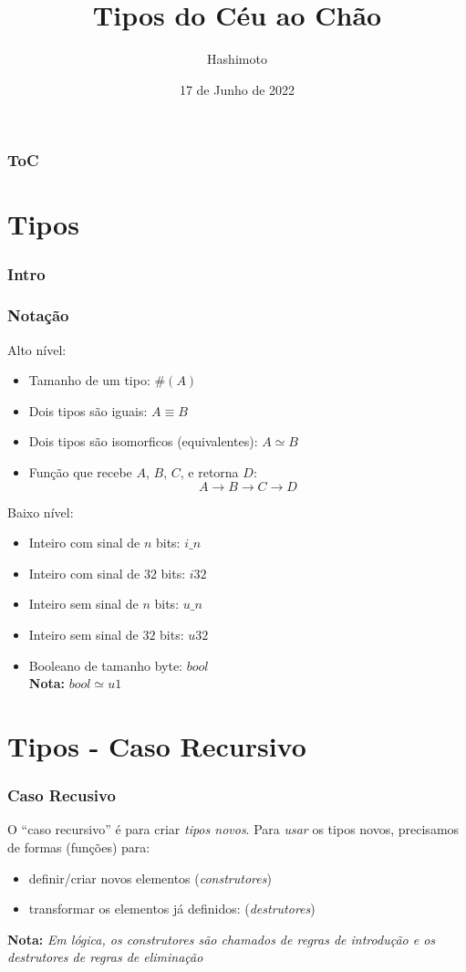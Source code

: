 \documentclass{beamer}
\title{Tipos do Céu ao Chão}
\author{Hashimoto}
\date{17 de Junho de 2022}
\newcommand{\nota}[1]{\textbf{Nota:}\textit{ #1}}
\newcommand{\typetam}{\#}
\newcommand{\typeeq}{\equiv}
\newcommand{\typesim}{\simeq}
\begin{document}
\begin{frame}
    \titlepage
\end{frame}

\begin{frame}
    \frametitle{ToC}
    \tableofcontents[hideallsubsections]
\end{frame}

\section{Tipos}
\begin{frame}
    \frametitle{Intro}
\end{frame}

\begin{frame}
    \frametitle{Notação}
    Alto nível:
    \begin{itemize}
        \item Tamanho de um tipo: \(\typetam(A)\)
        \item Dois tipos são iguais: \( A \typeeq B \)
        \item Dois tipos são isomorficos (equivalentes):
            \( A \typesim B \)
        \item Função que recebe \(A\), \(B\), \(C\),
            e retorna \(D\): \[ A \to B \to C \to D \]
    \end{itemize}

    Baixo nível:
    \begin{itemize}
        \item Inteiro com sinal de \(n\) bits: \(i\_n\)
        \item Inteiro com sinal de \(32\) bits: \(i32\)
        \item Inteiro sem sinal de \(n\) bits: \(u\_n\)
        \item Inteiro sem sinal de \(32\) bits: \(u32\)
        \item Booleano de tamanho byte: \(bool\)
            \\\nota{\(bool \typesim u1\)}
    \end{itemize}
\end{frame}

\section{Tipos - Caso Recursivo}
\begin{frame}
    \frametitle{Caso Recusivo}
    O ``caso recursivo'' é para criar \emph{tipos novos}.
    \vfill
    Para \emph{usar} os tipos novos,
    precisamos de formas (funções) para:
    \begin{itemize}
        \item definir/criar novos elementos
            (\emph{construtores})
        \item transformar os elementos já definidos:
            (\emph{destrutores})
    \end{itemize}
    \vfill
    \nota{Em lógica, os \emph{construtores}
        são chamados de \emph{regras de introdução} e
        os \emph{destrutores}
        de \emph{regras de eliminação}}
\end{frame}
\end{document}

